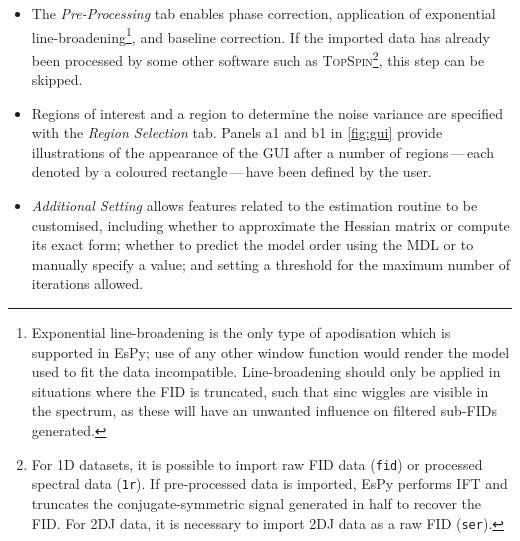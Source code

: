 \begin{itemize}
    \item The \emph{Pre-Processing} tab enables phase correction,
        application of exponential line-broadening\footnote{
            Exponential line-broadening is the only type of apodisation which
            is supported in \ac{EsPy}; use of any other window function
            would render the model used to fit the data incompatible.
            Line-broadening should only be applied in
            situations where the \ac{FID} is truncated, such that sinc wiggles
            are visible in the spectrum, as these will have an unwanted
            influence on filtered sub-\acp{FID} generated.
        }, and baseline correction. If the imported data has already been
        processed by some other software such as \textsc{TopSpin}\footnote{
            For \ac{1D} datasets, it is possible to import raw \ac{FID} data
            (\texttt{fid}) or processed spectral data (\texttt{1r}). If
            pre-processed data is imported, \ac{EsPy} performs \ac{IFT} and
            truncates the conjugate-symmetric signal generated in half to
            recover the \ac{FID}. For \ac{2DJ} data, it is necessary to import
            \ac{2DJ} data as a raw \ac{FID} (\texttt{ser}).
        }, this step can be skipped.
    \item Regions of interest and a region to determine the noise variance are
        specified with the \emph{Region Selection} tab. Panels a1 and b1 in
        \cref{fig:gui} provide illustrations of the appearance of the
        \ac{GUI} after a number of regions\,---\,each denoted by a coloured
        rectangle\,---\,have been defined by the user.
    \item \emph{Additional Setting} allows features related to the estimation
        routine to be customised, including whether to approximate the Hessian
        matrix or compute its exact form; whether to predict the model order
        using the \ac{MDL} or to manually specify a value; and setting a
        threshold for the maximum number of iterations allowed.
\end{itemize}

